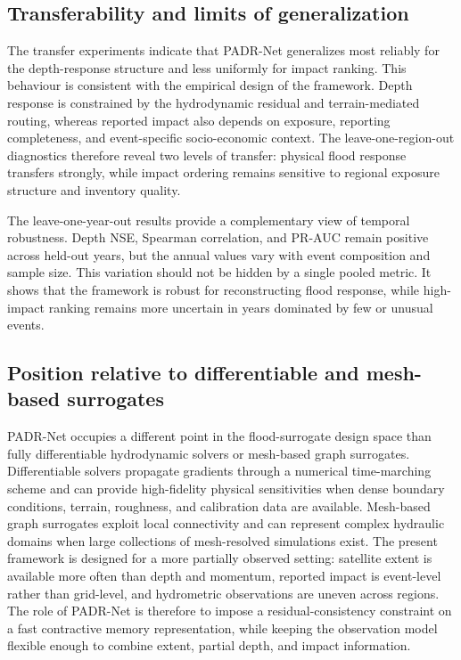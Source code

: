 \documentclass[pdflatex,sn-mathphys-ay]{sn-jnl}
\theoremstyle{thmstyleone}
\begin{document}
\subsection{Transferability and limits of generalization}

The transfer experiments indicate that PADR-Net generalizes most
reliably for the depth-response structure and less uniformly for impact
ranking.  This behaviour is consistent with the
empirical design of the framework.  Depth response is constrained by
the hydrodynamic residual and terrain-mediated routing, whereas
reported impact also depends on exposure, reporting completeness, and
event-specific socio-economic context.  The leave-one-region-out
diagnostics therefore reveal two levels of transfer: physical flood
response transfers strongly, while impact ordering remains sensitive to
regional exposure structure and inventory quality.

The leave-one-year-out results provide a complementary view of temporal
robustness.  Depth NSE, Spearman correlation, and PR-AUC remain
positive across held-out years, but the annual values vary with event
composition and sample size.  This variation should not be hidden by a
single pooled metric.  It shows that the framework is robust for
reconstructing flood response, while high-impact ranking remains more
uncertain in years dominated by few or unusual events.

\subsection{Position relative to differentiable and mesh-based surrogates}
\label{subsec:position_surrogates}

PADR-Net occupies a different point in the flood-surrogate design space
than fully differentiable hydrodynamic solvers or mesh-based graph
surrogates.  Differentiable solvers propagate gradients through a
numerical time-marching scheme and can provide high-fidelity physical
sensitivities when dense boundary conditions, terrain, roughness, and
calibration data are available.  Mesh-based graph surrogates exploit
local connectivity and can represent complex hydraulic domains when
large collections of mesh-resolved simulations exist.  The present
framework is designed for a more partially observed setting: satellite
extent is available more often than depth and momentum, reported impact
is event-level rather than grid-level, and hydrometric observations are
uneven across regions.  The role of PADR-Net is therefore
to impose a residual-consistency constraint on a fast contractive
memory representation, while keeping the observation model flexible
enough to combine extent, partial depth, and impact information.
\end{document}

